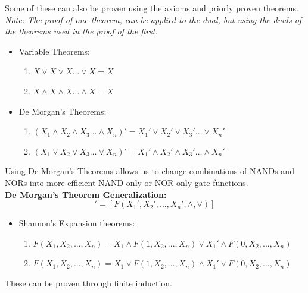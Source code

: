 \documentclass[nobib]{tufte-handout}
\begin{document}
Some of these can also be proven using the axioms and priorly proven theorems.
\textit{Note: The proof of one theorem, can be applied to the dual, but using the duals of the theorems used in the proof of the first.}
\begin{itemize}
    \item Variable Theorems:
          \begin{enumerate}
              \item $X\lor X\lor X \ldots \lor X = X$
              \item $X\land X\land X \ldots \land X = X$
          \end{enumerate}
    \item De Morgan's Theorems:
          \begin{enumerate}
              \item $(X_1\land X_2\land X_3 \ldots \land X_n)'=X_1'\lor X_2'\lor X_3' \ldots \lor X_n'$
              \item $(X_1\lor X_2\lor X_3 \ldots \lor X_n)'=X_1'\land X_2'\land X_3' \ldots \land X_n'$
          \end{enumerate}
\end{itemize}
Using De Morgan's Theorems allows us to change combinations of NANDs and NORs into more efficient NAND only or NOR only gate functions.\\
\textbf{De Morgan's Theorem Generalization:}
\begin{equation*}
    [F(X_1, X_2, . . . , X_n, \lor, \land)]'= [F(X_1', X_2', . . . , X_n', \land, \lor)]
\end{equation*}
\begin{itemize}
    \item Shannon's Expansion theorems:
          \begin{enumerate}
              \item $F(X_1, X_2, . . . , X_n) =X_1 \land F(1, X_2, . . . , X_n) \lor X_1' \land F(0, X_2, . . . , X_n)$
              \item $F(X_1, X_2, . . . , X_n) =X_1 \lor F(1, X_2, . . . , X_n) \land X_1' \lor F(0, X_2, . . . , X_n)$
          \end{enumerate}
\end{itemize}
These can be proven through finite induction.
\end{document}

